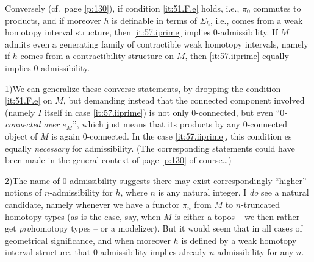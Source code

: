 Conversely (cf.\ page \ref{p:130}), if condition \ref{it:51.F.e}
holds, i.e., $\pi_0$ commutes to products, and if moreover $h$ is
definable in terms of $\Sigma_h$, i.e., comes from a weak homotopy
interval structure, then \ref{it:57.iprime} implies
$0$-admissibility. If $M$ admits even a generating family of
contractible weak homotopy intervals, namely if $h$ comes from a
contractibility structure on $M$, then \ref{it:57.iiprime} equally
implies $0$-admissibility.
\begin{remarks}
  1)\enspace We can generalize these converse statements, by dropping
  the condition \ref{it:51.F.e} on $M$, but demanding instead that the
  connected component involved (namely $I$ itself in case
  \ref{it:57.iiprime}) is not only $0$-connected, but even
  ``\emph{$0$-connected over $e_M$}'', which just means that its
  products by any $0$-connected object of $M$ is again
  $0$-connected. In the case \ref{it:57.iiprime}, this condition es
  equally \emph{necessary} for admissibility. (The corresponding
  statements could have been made in the general context of page
  \ref{p:130} of course\ldots)

  2)\enspace The name of $0$-admissibility suggests there may exist
  correspondingly ``higher'' notions of $n$-admissibility for $h$,
  where $n$ is any natural integer. I \emph{do} see a natural
  candidate, namely whenever we have a functor $\pi_n$ from $M$ to
  $n$-truncated homotopy types (as is the case, say, when $M$ is
  either a topos -- we then rather get \emph{pro}homotopy types -- or
  a modelizer). But it would seem that in all cases of geometrical
  significance, and when moreover $h$ is defined by a weak homotopy
  interval structure, that $0$-admissibility implies already
  $n$-admissibility for any $n$.
\end{remarks}

